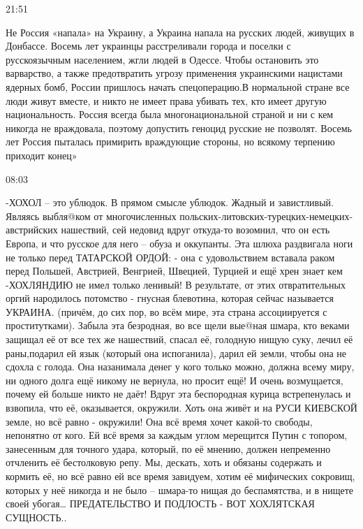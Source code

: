 21:51

Не Россия «напала» на Украину, а Украина напала на русских людей, живущих в
Донбассе. Восемь лет украинцы расстреливали города и поселки с русскоязычным
населением, жгли людей в Одессе. Чтобы остановить это варварство, а также
предотвратить угрозу применения украинскими нацистами ядерных бомб, России
пришлось начать спецоперацию.В нормальной стране все люди живут вместе, и никто
не имеет права убивать тех, кто имеет другую национальность. Россия всегда была
многонациональной страной и ни с кем никогда не враждовала, поэтому допустить
геноцид русские не позволят. Восемь лет Россия пыталась примирить враждующие
стороны, но всякому терпению приходит конец»

08:03

-ХОХОЛ – это ублюдок. В прямом смысле ублюдок. Жадный и завистливый. Являясь
выбля@ком от многочисленных польских-литовских-турецких-немецких-австрийских
нашествий, сей недовид вдруг откуда-то возомнил, что он есть Европа, и что
русское для него – обуза и оккупанты. Эта шлюха раздвигала ноги не только перед
ТАТАРСКОЙ ОРДОЙ: - она с удовольствием вставала раком перед Польшей, Австрией,
Венгрией, Швецией, Турцией и ещё хрен знает кем -ХОХЛЯНДИЮ не имел только
ленивый! В результате, от этих отвратительных оргий народилось потомство -
гнусная блевотина, которая сейчас называется УКРАИНА. (причём, до сих пор, во
всём мире, эта страна ассоциируется с проститутками). Забыла эта безродная, во
все щели вые@ная шмара, кто веками защищал её от все тех же нашествий, спасал
её, голодную нищую суку, лечил её раны,подарил ей язык (который она
испоганила), дарил ей земли, чтобы она не сдохла с голода. Она назанимала денег
у кого только можно, должна всему миру, ни одного долга ещё никому не вернула,
но просит ещё! И очень возмущается, почему ей больше никто не даёт! Вдруг эта
беспородная курица встрепенулась и взвопила, что её, оказывается, окружили.
Хоть она живёт и на РУСИ КИЕВСКОЙ земле, но всё равно - окружили! Она всё время
хочет какой-то свободы, непонятно от кого. Ей всё время за каждым углом
мерещится Путин с топором, занесенным для точного удара, который, по её мнению,
должен непременно отчленить её бестолковую репу. Мы, дескать, хоть и обязаны
содержать и кормить её, но всё равно ей все время завидуем, хотим её мифических
сокровищ, которых у неё никогда и не было – шмара-то нищая до беспамятства, и в
нищете своей убогая… ПРЕДАТЕЛЬСТВО И ПОДЛОСТЬ - ВОТ ХОХЛЯТСКАЯ СУЩНОСТЬ..

